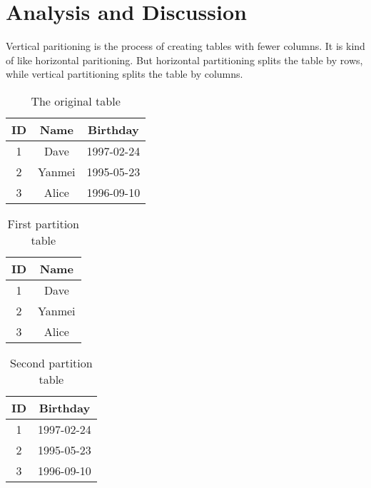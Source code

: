 \documentclass[12pt, a4paper]{article}
\begin{document}
\section{Analysis and Discussion}

Vertical paritioning is the process of creating tables with fewer columns.\cite{wiki2} It is kind of like horizontal paritioning. But horizontal partitioning splits the table by rows, while vertical partitioning splits the table by columns.

\begin{table}[H]
\centering
\caption{The original table}\label{tab:tab}
\begin{tabular}{ccc}
  \toprule
  ID &Name &Birthday\\
  \midrule
  1 &Dave &1997-02-24\\
  2 &Yanmei &1995-05-23\\
  3 &Alice &1996-09-10\\
  \bottomrule
\end{tabular}
\end{table}

\begin{minipage}[t]{0.5\linewidth}
  \begin{table}[H]
    \centering
    \caption{First partition table}\label{tab:stab1}
    \begin{tabular}{cc}
      \toprule
      ID &Name\\
      \midrule
      1 &Dave \\
      2 &Yanmei\\
      3 &Alice\\
      \bottomrule
    \end{tabular}
  \end{table}
\end{minipage}
\begin{minipage}[t]{0.5\linewidth}

\begin{table}[H]
\centering
\caption{Second partition table}\label{tab:stab2}
\begin{tabular}{cc}
  \toprule
  ID &Birthday\\
  \midrule
  1  &1997-02-24\\
  2  &1995-05-23\\
  3  &1996-09-10\\
  \bottomrule
\end{tabular}
\end{table}
\end{minipage}
\end{document}
